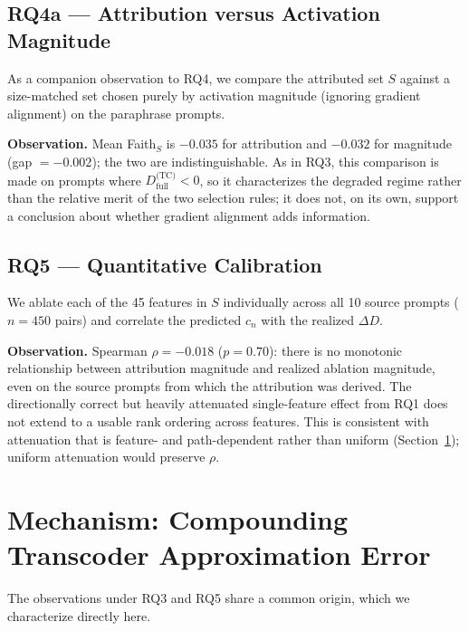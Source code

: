 \documentclass{article}
\begin{document}
\subsection{RQ4a --- Attribution versus Activation Magnitude}

As a companion observation to RQ4, we compare the attributed set $S$ against a
size-matched set chosen purely by activation magnitude (ignoring gradient
alignment) on the paraphrase prompts.

\textbf{Observation.} Mean Faith$_S$ is $-0.035$ for attribution and $-0.032$
for magnitude (gap $= -0.002$); the two are indistinguishable. As in RQ3, this
comparison is made on prompts where $D_\text{full}^\text{(TC)} < 0$, so it
characterizes the degraded regime rather than the relative merit of the two
selection rules; it does not, on its own, support a conclusion about whether
gradient alignment adds information.

\subsection{RQ5 --- Quantitative Calibration}

We ablate each of the 45 features in $S$ individually across all 10 source
prompts ($n = 450$ pairs) and correlate the predicted $c_n$ with the realized
$\Delta D$.

\textbf{Observation.} Spearman $\rho = -0.018$ ($p = 0.70$): there is no
monotonic relationship between attribution magnitude and realized ablation
magnitude, even on the source prompts from which the attribution was derived.
The directionally correct but heavily attenuated single-feature effect from RQ1
does not extend to a usable rank ordering across features. This is consistent
with attenuation that is feature- and path-dependent rather than uniform
(Section~\ref{sec:root_cause}); uniform attenuation would preserve $\rho$.

\section{Mechanism: Compounding Transcoder Approximation Error}
\label{sec:root_cause}

The observations under RQ3 and RQ5 share a common origin, which we characterize
directly here.
\end{document}
